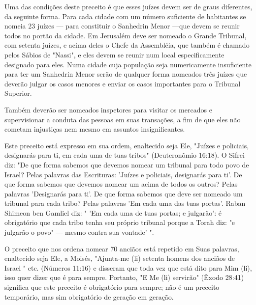 \begin{itemize}
\begin{enumrate}
\begin{itemize}
\begin{itemize}
\begin{itemize}
Uma das condições deste preceito é que esses juízes devem ser de graus
diferentes, da seguinte forma. Para cada cidade com um número
suficien­te de habitantes se nomeia 23 juízes --- para constituir o
Sanhedrin Menor ---que devem se reunir todos no portão da cidade. Em
Jerusalém deve ser nomea­do o Grande Tribunal, com setenta juízes, e
acima deles o Chefe da Assembléia, que também é chamado pelos Sábios de
"Nassi", e eles devem se reunir num local especificamente designado para
eles. Numa cidade cuja população seja nu­mericamente insuficiente para
ter um Sanhedrin Menor serão de qualquer for­ma nomeados três juízes que
deverão julgar os casos menores e enviar os casos importantes para o
Tribunal Superior.

Também deverão ser nomeados inspetores para visitar os mercados e
supervisionar a conduta das pessoas em suas transações, a fim de que
eles não cometam injustiças nem mesmo em assuntos insignificantes.

Este preceito está expresso em sua ordem, enaltecido seja Ele, "Juí­zes
e policiais, designarás para ti, em cada uma de tuas tribos"
(Deuteronômio 16:18). O Sifrei diz: "De que forma sabemos que devemos
nomear um tribunal para todo povo de Israel? Pelas palavras das
Escrituras: 'Juízes e policiais, desig­narás para ti'. De que forma
sabemos que devemos nomear um acima de todos 
os outros? Pelas palavras 'Designarás para ti'. De que forma sabemos
que deve ser nomeado um tribunal para cada tribo? Pelas palavras 'Em
cada uma das tuas portas'. Raban Shimeon ben Gamliel diz: " 'Em cada uma
de tuas por­tas; e julgarão': é obrigatório que cada tribo tenha seu
próprio tribunal porque a Torah diz: "e julgarão o povo" --- mesmo
contra sua vontade' ".

O preceito que nos ordena nomear 70 anciãos está repetido em Suas
palavras, enaltecido seja Ele, a Moisés, "Ajunta-me (li) setenta homens
dos an­ciãos de Israel " etc. (Números 11:16) e disseram que toda vez
que está dito para Mim (li), isso quer dizer que é para sempre.
Portanto, "E Me (li) servirão" (Êxodo 28:41) significa que este preceito
é obrigatório para sempre; não é um preceito temporário, mas sim
obrigatório de geração em geração.


\end{itemize}
\end{itemize}
\end{itemize}
\end{enumrate}
\end{itemize}
